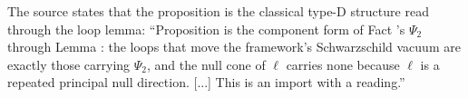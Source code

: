 The source states that the proposition is the classical type-D structure read through the loop lemma: ``Proposition  is the component form of Fact 's $\Psi_{2}$ through Lemma : the loops that move the framework's Schwarzschild vacuum are exactly those carrying $\Psi_{2}$, and the null cone of $\ell$ carries none because $\ell$ is a repeated principal null direction. [...] This is an import with a reading.''
